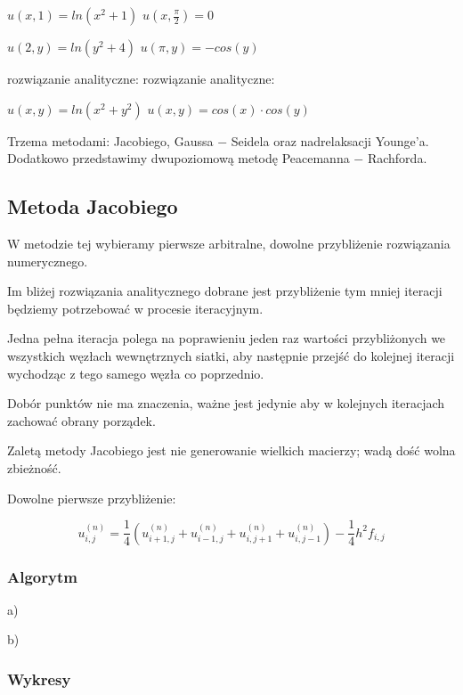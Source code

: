 $u(x,1) = ln(x^2 + 1)$ \hspace{3.28cm} $u(x,\frac{\pi}{2}) = 0$

$u(2,y) = ln(y^2 + 4)$ \hspace{3.3cm} $u(\pi,y) = -cos(y)$

rozwiązanie analityczne: \hspace{2.6cm} rozwiązanie analityczne:

$u(x,y) = ln(x^2 + y^2)$ \hspace{3.1cm} $u(x,y) = cos(x)\cdot cos(y)$

\vspace{0.5cm}

Trzema metodami: Jacobiego, Gaussa $-$ Seidela oraz nadrelaksacji Younge'a. Dodatkowo przedstawimy dwupoziomową metodę Peacemanna $-$ Rachforda.

\subsection{Metoda Jacobiego}

W metodzie tej wybieramy pierwsze arbitralne, dowolne przybliżenie rozwiązania numerycznego.

Im bliżej rozwiązania analitycznego dobrane jest przybliżenie tym mniej iteracji będziemy potrzebować w procesie iteracyjnym.

Jedna pełna iteracja polega na poprawieniu jeden raz wartości przybliżonych we wszystkich węzłach wewnętrznych siatki, aby następnie przejść do kolejnej iteracji wychodząc z tego samego węzła co poprzednio.

Dobór punktów nie ma znaczenia, ważne jest jedynie aby w kolejnych iteracjach zachować obrany porządek.

Zaletą metody Jacobiego jest nie generowanie wielkich macierzy; wadą dość wolna zbieżność.

Dowolne pierwsze przybliżenie:

$$u_{i,j}^{(n)} = \frac{1}{4}(u_{i+1,j}^{(n)} + u_{i-1,j}^{(n)} + u_{i,j+1}^{(n)} + u_{i,j-1}^{(n)}) - \frac{1}{4}h^2f_{i,j}$$

\subsubsection{Algorytm}

a)


\newpage
b)


\newpage
\subsubsection{Wykresy}

